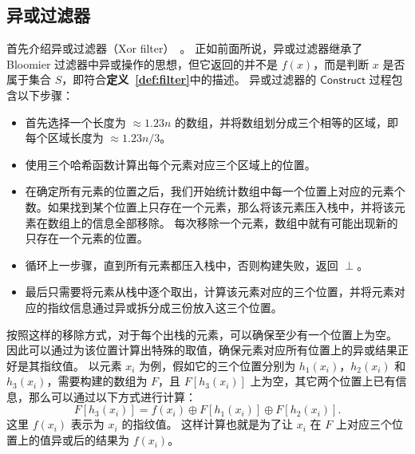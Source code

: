 


\subsection{异或过滤器}


首先介绍异或过滤器（Xor filter）~\cite{graf2020xor}。
正如前面所说，异或过滤器继承了 Bloomier 过滤器中异或操作的思想，但它返回的并不是 $f(x)$，而是判断 $x$ 是否属于集合 $S$，即符合\textbf{定义~\ref{def:filter}}中的描述。
异或过滤器的 $\mathsf{Construct}$ 过程包含以下步骤：
\begin{itemize}
  \item 首先选择一个长度为 $\approx 1.23n$ 的数组，并将数组划分成三个相等的区域，即每个区域长度为 $\approx 1.23n/3$。
  \item 使用三个哈希函数计算出每个元素对应三个区域上的位置。
  \item 在确定所有元素的位置之后，我们开始统计数组中每一个位置上对应的元素个数。如果找到某个位置上只存在一个元素，那么将该元素压入栈中，并将该元素在数组上的信息全部移除。
每次移除一个元素，数组中就有可能出现新的只存在一个元素的位置。
  \item 循环上一步骤，直到所有元素都压入栈中，否则构建失败，返回 $\perp$。
  \item 最后只需要将元素从栈中逐个取出，计算该元素对应的三个位置，并将元素对应的指纹信息通过异或拆分成三份放入这三个位置。
\end{itemize}
按照这样的移除方式，对于每个出栈的元素，可以确保至少有一个位置上为空。
因此可以通过为该位置计算出特殊的取值，确保元素对应所有位置上的异或结果正好是其指纹值。
以元素 $x_i$ 为例，假如它的三个位置分别为 $h_1(x_i)$，$h_2(x_i)$ 和 $h_3(x_i)$，需要构建的数组为 $F$，且 $F[h_3(x_i)]$ 上为空，其它两个位置上已有信息，那么可以通过以下方式进行计算：
\begin{equation}
  F[h_3(x_i)] = f(x_i) \oplus F[h_1(x_i)] \oplus F[h_2(x_i)].
\end{equation}
这里 $f(x_i)$ 表示为 $x_i$ 的指纹值。
这样计算也就是为了让 $x_i$ 在 $F$ 上对应三个位置上的值异或后的结果为 $f(x_i)$。

